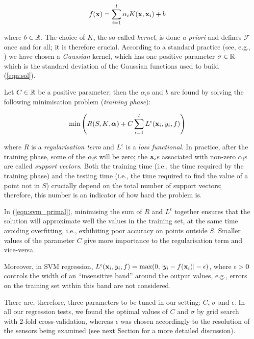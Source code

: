 \begin{equation} \label{eqn:sol}
  f(\mathbf{x}) = \sum_{i=1}^l \alpha_i K(\mathbf{x},\mathbf{x}_i) + b
\end{equation}

\noindent where $b \in \mathbb{R}$. The choice of $K$, the so-called
\emph{kernel}, is done \emph{a priori} and defines $\mathcal{F}$ once and for
all; it is therefore crucial. According to a standard practice (see,
e.g., \cite{Cristianini00}) we have chosen a \emph{Gaussian} kernel,
which has one positive parameter $\sigma \in \mathbb{R}$ which is the
standard deviation of the Gaussian functions used to build
(\ref{eqn:sol}).

Let $C \in \mathbb{R}$ be a positive parameter; then the $\alpha_i$s and $b$
are found by solving the following minimisation problem
(\emph{training phase}):

\begin{equation} \label{eqn:svm_primal}
  \min \left( R(S,K,\boldsymbol{\alpha}) + C \sum_{i=1}^l L^\epsilon (\mathbf{x}_i,y_i,f) \right)
\end{equation}

\noindent where $R$ is a \emph{regularisation term} and
$L^\epsilon$ is a \emph{loss functional}. In practice, after the
training phase, some of the $\alpha_i$s will be zero; the $\mathbf{x}_i$s
associated with non-zero $\alpha_i$s are called \emph{support
vectors}. Both the training time (i.e., the time required by the
training phase) and the testing time (i.e., the time required to find
the value of a point not in $S$) crucially depend on the total number
of support vectors; therefore, this number is an indicator of how hard
the problem is.

In (\ref{eqn:svm_primal}), minimising the sum of $R$ and $L^\epsilon$
together ensures that the solution will approximate well the values in
the training set, at the same time avoiding overfitting, i.e.,
exhibiting poor accuracy on points outside $S$. Smaller values of the
parameter $C$ give more importance to the regularisation term and
vice-versa.

Moreover, in SVM regression, $L^\epsilon (\mathbf{x}_i,y_i,f) =
\mbox{max}(0,|y_i-f(\mathbf{x}_i)|-\epsilon)$, where $\epsilon > 0$ controls
the width of an ``insensitive band'' around the output values, e.g.,
errors on the training set within this band are not considered.

There are, therefore, three parameters to be tuned in our setting:
$C$, $\sigma$ and $\epsilon$. In all our regression tests, we found
the optimal values of $C$ and $\sigma$ by grid search with $2$-fold
cross-validation, whereas $\epsilon$ was chosen accordingly to the
resolution of the sensors being examined (see next Section for a more
detailed discussion).

